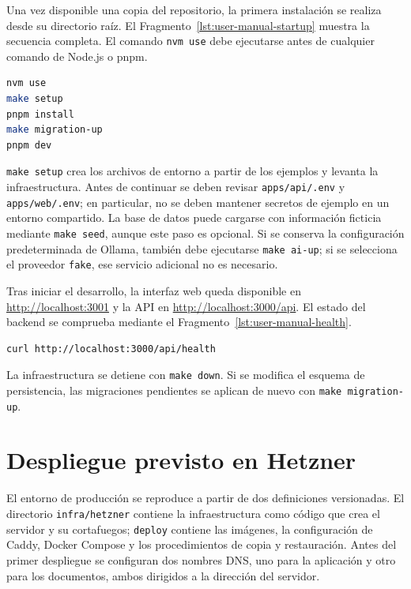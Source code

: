 Una vez disponible una copia del repositorio, la primera instalación se realiza
desde su directorio raíz. El Fragmento~\ref{lst:user-manual-startup} muestra la
secuencia completa. El comando \texttt{nvm use} debe ejecutarse antes de
cualquier comando de Node.js o pnpm.

\begin{lstlisting}[language=bash,caption={Puesta en marcha del entorno local.},label={lst:user-manual-startup}]
nvm use
make setup
pnpm install
make migration-up
pnpm dev
\end{lstlisting}

\texttt{make setup} crea los archivos de entorno a partir de los ejemplos y
levanta la infraestructura. Antes de continuar se deben revisar
\texttt{apps/api/.env} y \texttt{apps/web/.env}; en particular, no se deben
mantener secretos de ejemplo en un entorno compartido. La base de datos puede
cargarse con información ficticia mediante \texttt{make seed}, aunque este
paso es opcional. Si se conserva la configuración predeterminada de Ollama,
también debe ejecutarse \texttt{make ai-up}; si se selecciona el proveedor
\texttt{fake}, ese servicio adicional no es necesario.

Tras iniciar el desarrollo, la interfaz web queda disponible en
\url{http://localhost:3001} y la API en \url{http://localhost:3000/api}. El
estado del backend se comprueba mediante el Fragmento~\ref{lst:user-manual-health}.

\begin{lstlisting}[language=bash,caption={Comprobación del estado de la API.},label={lst:user-manual-health}]
curl http://localhost:3000/api/health
\end{lstlisting}

La infraestructura se detiene con \texttt{make down}. Si se modifica el
esquema de persistencia, las migraciones pendientes se aplican de nuevo con
\texttt{make migration-up}.

\section{Despliegue previsto en Hetzner}
\label{sec:user-manual-deployment}

El entorno de producción se reproduce a partir de dos definiciones versionadas.
El directorio \texttt{infra/hetzner} contiene la infraestructura como código
que crea el servidor y su cortafuegos; \texttt{deploy} contiene las imágenes,
la configuración de Caddy, Docker Compose y los procedimientos de copia y
restauración. Antes del primer despliegue se configuran dos nombres DNS, uno
para la aplicación y otro para los documentos, ambos dirigidos a la dirección
del servidor.

